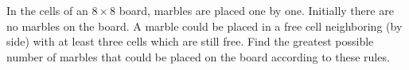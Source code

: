 In the cells of an $8\times 8$ board, marbles are placed one by one. Initially there are no marbles on the board. A marble could be placed in a free cell neighboring (by side) with at least three cells which are still free. Find the greatest possible number of marbles that could be placed on the board according to these rules.